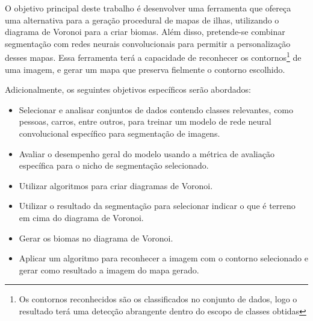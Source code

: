 O objetivo principal deste trabalho é desenvolver uma ferramenta que ofereça uma alternativa para a geração procedural de mapas de ilhas, utilizando o diagrama de Voronoi para a criar biomas. Além disso, pretende-se combinar segmentação com redes neurais convolucionais para permitir a personalização desses mapas. Essa ferramenta terá a capacidade de reconhecer os contornos\footnote{Os contornos reconhecidos são os classificados no conjunto de dados, logo o resultado terá uma detecção abrangente dentro do escopo de classes obtidas} de uma imagem, e gerar um mapa que preserva fielmente o contorno escolhido.

Adicionalmente, os seguintes objetivos específicos serão abordados:

\begin{itemize}
	\item Selecionar e analisar conjuntos de dados contendo classes relevantes, como pessoas, carros, entre outros, para treinar um modelo de rede neural convolucional específico para segmentação de imagens.
	\item Avaliar o desempenho geral do modelo usando a métrica de avaliação específica para o nicho de segmentação selecionado.
	\item Utilizar algoritmos para criar diagramas de Voronoi.
	\item Utilizar o resultado da segmentação para selecionar indicar o que é terreno em cima do diagrama de Voronoi.
	\item Gerar os biomas no diagrama de Voronoi.
	\item Aplicar um algoritmo para reconhecer a imagem com o contorno selecionado e gerar como resultado a imagem do mapa gerado.
\end{itemize}

